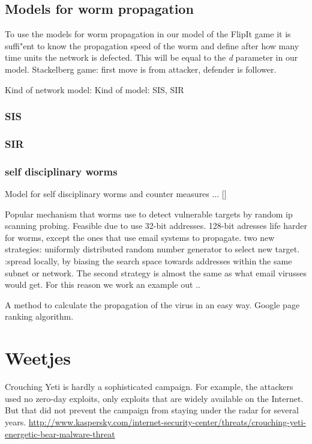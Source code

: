 \subsection{Models for worm propagation}
To use the models for worm propagation in our model of the FlipIt game it is suffi"ent to know the propagation speed of the worm and define after how many time units the network is defected. This will be equal to the \textit{d} parameter in our model.  
Stackelberg game: first move is from attacker, defender is follower. 

Kind of network model: 
Kind of model: SIS, SIR

\subsubsection*{SIS}

\subsubsection*{SIR}

\subsubsection*{self disciplinary worms}
Model for self disciplinary worms and counter measures ... []

Popular mechanism that worms use to detect vulnerable targets by random ip scanning probing. Feasible due to use 32-bit addresses. 128-bit adresses life harder for worms, except the ones that use email systems to propagate. two new strategies: uniformly distributed random number generator to select new target. :spread locally, by biasing the search space towards addresses within the same subnet or network. 
The second strategy is almost the same as what email virusses would get. For this reason we work an example out .. 



A method to calculate the propagation of the virus in an easy way. Google page ranking algorithm. 


\section{Weetjes}
\begin{description}
\item Crouching Yeti is hardly a sophisticated campaign. For example, the attackers used no zero-day exploits, only exploits that are widely available on the Internet. But that did not prevent the campaign from staying under the radar for several years. \url{http://www.kaspersky.com/internet-security-center/threats/crouching-yeti-energetic-bear-malware-threat}
\end{description}

